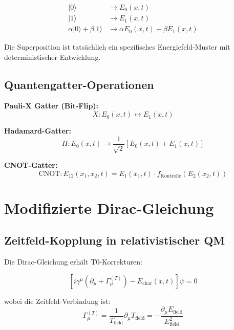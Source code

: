 \documentclass[12pt,a4paper]{report}
\begin{document}
\begin{align}
	|0\rangle &\rightarrow E_0(x,t) \\
	|1\rangle &\rightarrow E_1(x,t) \\
	\alpha|0\rangle + \beta|1\rangle &\rightarrow \alpha E_0(x,t) + \beta E_1(x,t)
\end{align}

Die Superposition ist tatsächlich ein spezifisches Energiefeld-Muster mit deterministischer Entwicklung.

\subsection{Quantengatter-Operationen}
\label{subsec:quantum_gate_operations}

\textbf{Pauli-X Gatter (Bit-Flip):}
\begin{equation}
	X: E_0(x,t) \leftrightarrow E_1(x,t)
\end{equation}

\textbf{Hadamard-Gatter:}
\begin{equation}
	H: E_0(x,t) \rightarrow \frac{1}{\sqrt{2}}[E_0(x,t) + E_1(x,t)]
\end{equation}

\textbf{CNOT-Gatter:}
\begin{equation}
	\text{CNOT}: E_{12}(x_1,x_2,t) = E_1(x_1,t) \cdot f_{\text{Kontrolle}}(E_2(x_2,t))
\end{equation}

\section{Modifizierte Dirac-Gleichung}
\label{sec:modified_dirac}

\subsection{Zeitfeld-Kopplung in relativistischer QM}
\label{subsec:dirac_time_field}

Die Dirac-Gleichung erhält T0-Korrekturen:

\begin{equation}
	\left[i\gamma^\mu\left(\partial_\mu + \Gamma_\mu^{(T)}\right) - E_{\text{char}}(x,t)\right]\psi = 0
\end{equation}

wobei die Zeitfeld-Verbindung ist:
\begin{equation}
	\Gamma_\mu^{(T)} = \frac{1}{T_{\text{field}}} \partial_\mu T_{\text{field}} = -\frac{\partial_\mu E_{\text{field}}}{E_{\text{field}}^2}
\end{equation}
\end{document}
